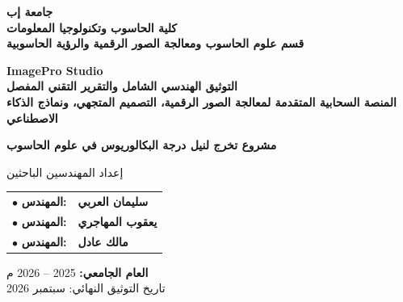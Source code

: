 \documentclass[12pt,a4paper]{report}
\begin{document}
\begin{titlepage}
    \centering
    \vspace*{1cm}
    {\LARGE \textbf{جامعة إب}}\\[0.3cm]
    {\large \textbf{كلية الحاسوب وتكنولوجيا المعلومات}}\\[0.2cm]
    {\large \textbf{قسم علوم الحاسوب ومعالجة الصور الرقمية والرؤية الحاسوبية}}\\[1.5cm]

    \begin{tcolorbox}[colback=StudioLight,colframe=StudioPrimary,arc=4mm,width=0.95\textwidth,center]
        \centering
        \vspace{0.5cm}
        {\Huge \bfseries \textcolor{StudioPrimary}{ImagePro Studio}}\\[0.4cm]
        {\Large \bfseries التوثيق الهندسي الشامل والتقرير التقني المفصل}\\[0.3cm]
        {\normalsize \textbf{المنصة السحابية المتقدمة لمعالجة الصور الرقمية، التصميم المتجهي، ونماذج الذكاء الاصطناعي}}\\[0.5cm]
    \end{tcolorbox}

    \vspace{1.5cm}
    {\large \textbf{مشروع تخرج لنيل درجة البكالوريوس في علوم الحاسوب}}\\[1.2cm]

    \begin{minipage}{0.85\textwidth}
        \begin{techbox}{إعداد المهندسين الباحثين}
            \centering \large
            \begin{tabular}{r l}
                $\bullet$ \textbf{المهندس:} & \textbf{سليمان العربي} \\[0.25cm]
                $\bullet$ \textbf{المهندس:} & \textbf{يعقوب المهاجري} \\[0.25cm]
                $\bullet$ \textbf{المهندس:} & \textbf{مالك عادل} \\
            \end{tabular}
        \end{techbox}
    \end{minipage}

    \vfill
    {\textbf{العام الجامعي:} 2025 -- 2026 م}\\[0.2cm]
    {\small تاريخ التوثيق النهائي: سبتمبر 2026}
\end{titlepage}
\end{document}
